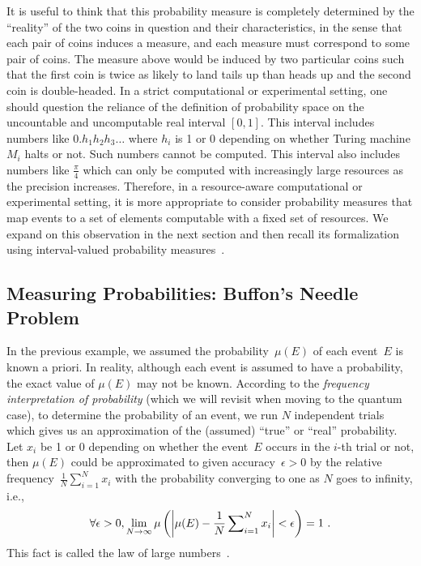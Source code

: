 \documentclass{article}
\theoremstyle{remark}
\newcommand{\pmeas}{\ensuremath{\mu}}
\begin{document}
\noindent It is useful to think that this probability measure is
completely determined by the ``reality'' of the two coins in question
and their characteristics, in the sense that each pair of coins
induces a measure, and each measure must correspond to some pair of
coins. The measure above would be induced by two particular coins such
that the first coin is twice as likely to land tails up than heads up
and the second coin is double-headed. In a strict computational
or experimental setting, one should question the reliance of the
definition of probability space on the uncountable and uncomputable
real interval $[0,1]$. This interval includes numbers like
$0.h_{1}h_{2}h_{3}\ldots$ where $h_{i}$ is 1 or 0 depending on whether
Turing machine $M_{i}$ halts or not. Such numbers cannot be
computed. This interval also includes numbers like $\frac{\pi}{4}$
which can only be computed with increasingly large resources as the
precision increases. Therefore, in a resource-aware computational or
experimental setting, it is more appropriate to consider probability
measures that map events to a set of elements computable with a fixed
set of resources. We expand on this observation in the next section
and then recall its formalization using interval-valued probability
measures~\cite{Weichselberger2000,JamisonLodwick2004}.

\subsection{Measuring Probabilities: Buffon's Needle Problem\label{subsec:Measuring-Probabilities:-Buffon}}

In the previous example, we assumed the probability~$\pmeas(E)$ of
each event~$E$ is known a priori. In reality, although each event is
assumed to have a probability, the exact value of $\pmeas(E)$ may not
be known. According to the \emph{frequency interpretation of
  probability} (which we will revisit when moving to the quantum
case), to determine the probability of an event, we run $N$
independent trials which gives us an approximation of the (assumed)
``true'' or ``real'' probability. Let $x_{i}$ be 1 or 0 depending on
whether the event~$E$ occurs in the $i$-th trial or not, then
$\pmeas(E)$ could be approximated to given accuracy~$\epsilon>0$ by
the relative frequency~$\frac{1}{N}\sum_{i=1}^{N}x_{i}$ with the
probability converging to one as $N$ goes to infinity, i.e.,
\[
\forall\epsilon>0,\lim_{N\rightarrow\infty}\pmeas\left(\left|\pmeas(E)-\frac{1}{N}\sideset{}{_{i=1}^{N}}\sum x_{i}\right|<\epsilon\right)=1\textrm{ .}
\]
This fact is called the law of large numbers~\cite{Bernoulli2006,Kolmogorov1950,Uspensky1937,Shafer1976,544199}.
\end{document}
